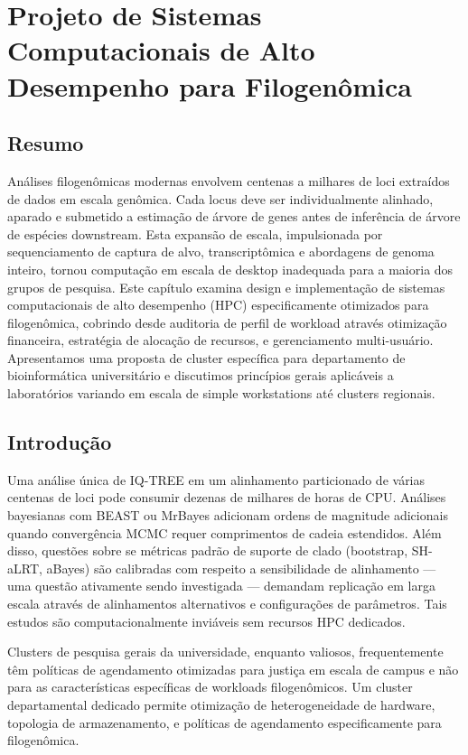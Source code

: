 
\chapter{Projeto de Sistemas Computacionais de Alto Desempenho para Filogenômica}

\section*{Resumo}

Análises filogenômicas modernas envolvem centenas a milhares de loci extraídos de dados em escala genômica. Cada locus deve ser individualmente alinhado, aparado e submetido a estimação de árvore de genes antes de inferência de árvore de espécies downstream. Esta expansão de escala, impulsionada por sequenciamento de captura de alvo, transcriptômica e abordagens de genoma inteiro, tornou computação em escala de desktop inadequada para a maioria dos grupos de pesquisa. Este capítulo examina design e implementação de sistemas computacionais de alto desempenho (HPC) especificamente otimizados para filogenômica, cobrindo desde auditoria de perfil de workload através otimização financeira, estratégia de alocação de recursos, e gerenciamento multi-usuário. Apresentamos uma proposta de cluster específica para departamento de bioinformática universitário e discutimos princípios gerais aplicáveis a laboratórios variando em escala de simple workstations até clusters regionais.

\section{Introdução}

Uma análise única de IQ-TREE em um alinhamento particionado de várias centenas de loci pode consumir dezenas de milhares de horas de CPU. Análises bayesianas com BEAST ou MrBayes adicionam ordens de magnitude adicionais quando convergência MCMC requer comprimentos de cadeia estendidos. Além disso, questões sobre se métricas padrão de suporte de clado (bootstrap, SH-aLRT, aBayes) são calibradas com respeito a sensibilidade de alinhamento --- uma questão ativamente sendo investigada --- demandam replicação em larga escala através de alinhamentos alternativos e configurações de parâmetros. Tais estudos são computacionalmente inviáveis sem recursos HPC dedicados.

Clusters de pesquisa gerais da universidade, enquanto valiosos, frequentemente têm políticas de agendamento otimizadas para justiça em escala de campus e não para as características específicas de workloads filogenômicos. Um cluster departamental dedicado permite otimização de heterogeneidade de hardware, topologia de armazenamento, e políticas de agendamento especificamente para filogenômica.


